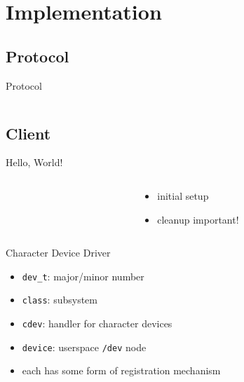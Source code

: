 \documentclass[handout]{beamer}
\begin{document}
\section{Implementation}

\subsection{Protocol}

\begin{frame}{Protocol}
  \begin{columns}
    \begin{column}{0.5\textwidth}
      
    \end{column}
    \begin{column}{0.5\textwidth}
      
    \end{column}
  \end{columns}
\end{frame}

\subsection{Client}

\begin{frame}{Hello, World!}
  \begin{columns}
    \begin{column}{0.6\textwidth}
      
    \end{column}
    \begin{column}{0.4\textwidth}
      \begin{itemize}
        \item initial setup
        \item cleanup important!
      \end{itemize}
    \end{column}
  \end{columns}
\end{frame}

\begin{frame}{Character Device Driver}
  

  \begin{itemize}
    \item<1-> \texttt{dev\_t}: major/minor number
    \item<2-> \texttt{class}: subsystem
    \item<3-> \texttt{cdev}: handler for character devices
    \item<4-> \texttt{device}: userspace \texttt{/dev} node
    \item<5-> each has some form of registration mechanism
  \end{itemize}
\end{frame}
\end{document}
